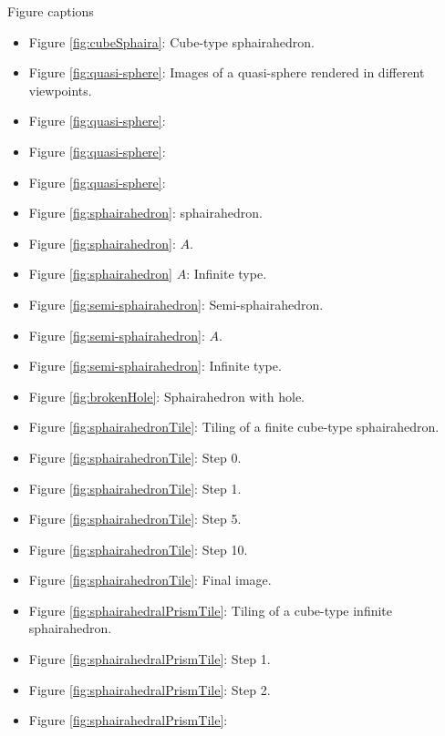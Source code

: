\documentclass[suppldata, dvipdfmx]{interact}
\theoremstyle{plain}%
\theoremstyle{definition}
\theoremstyle{remark}
\theoremstyle{problemstyle}
\begin{document}
Figure captions
\begin{itemize}
 \item Figure \ref{fig:cubeSphaira}: Cube-type sphairahedron.
 \item Figure \ref{fig:quasi-sphere}: Images of a quasi-sphere rendered
       in different viewpoints. 
 \item Figure \ref{fig:quasi-sphere}:
 \item Figure \ref{fig:quasi-sphere}:
 \item Figure \ref{fig:quasi-sphere}:
 \item Figure \ref{fig:sphairahedron}: sphairahedron.
 \item Figure \ref{fig:sphairahedron}:
       $A$.
 \item Figure \ref{fig:sphairahedron}
       $A$: Infinite type.
 \item Figure \ref{fig:semi-sphairahedron}: Semi-sphairahedron.
 \item Figure \ref{fig:semi-sphairahedron}:
       $A$.
 \item Figure \ref{fig:semi-sphairahedron}:
       Infinite type.
 \item Figure \ref{fig:brokenHole}: Sphairahedron with hole.
 \item Figure \ref{fig:sphairahedronTile}: Tiling of a finite cube-type
       sphairahedron.
 \item Figure \ref{fig:sphairahedronTile}: Step 0.
 \item Figure \ref{fig:sphairahedronTile}: Step 1.
 \item Figure \ref{fig:sphairahedronTile}: Step 5.
 \item Figure \ref{fig:sphairahedronTile}: Step
       10.
 \item Figure \ref{fig:sphairahedronTile}:
       Final image.
 \item Figure \ref{fig:sphairahedralPrismTile}: Tiling of a cube-type
       infinite sphairahedron.
 \item Figure \ref{fig:sphairahedralPrismTile}:
       Step 1.
 \item Figure \ref{fig:sphairahedralPrismTile}:
       Step 2.
 \item Figure \ref{fig:sphairahedralPrismTile}:

\end{itemize}
\end{document}
